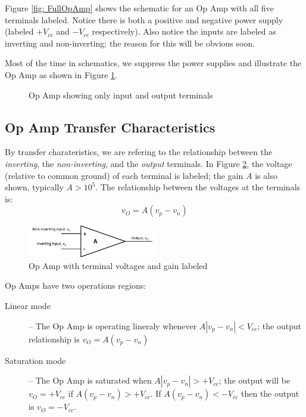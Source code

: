 \documentclass{handout}
\begin{document}
Figure \ref{fig: FullOpAmp} shows the schematic for an Op Amp with all five terminals labeled.  Notice there is both a positive and negative power supply (labeled $+V_{cc}$ and $-V_{cc}$ respectively).  Also notice the inputs are labeled as inverting and non-inverting; the reason for this will be obvious soon.

Most of the time in schematics, we suppress the power supplies and illustrate the Op Amp as shown in Figure \ref{fig: OpAmp}.
\begin{figure} [h! t! b!]
\centering
{}
\caption{Op Amp showing only input and output terminals}
\label{fig: OpAmp}
\end{figure}

\subsection{Op Amp Transfer Characteristics}
By transfer charateristics, we are refering to the relationship between the {\em inverting}, the {\em non-inverting}, and the {\em output} terminals.  In Figure \ref{fig: OpAmp2}, the voltage (relative to common ground) of each terminal is labeled; the gain $A$  is also shown, typically $A>10^5$.  The relationship between the voltages at the terminals is:
\begin{equation}
v_O=A(v_p-v_n)
\end{equation}

\begin{figure} [h! t! b!]
\centering
\includegraphics[width=0.5\textwidth]{OpAmp2.jpg}
\caption{Op Amp with terminal voltages  and gain labeled}
\label{fig: OpAmp2}
\end{figure}

Op Amps have two operations regions:
\begin{description}
\item[Linear mode] -- The Op Amp is operating lineraly whenever $A|v_p-v_n|<V_{cc}$; the output relationship is $v_O=A(v_p-v_n)$
\item[Saturation mode] -- The Op Amp is saturated when $A|v_p-v_n|>+V_{cc}$; the output will be $v_O=+V_{cc}$ if $A(v_p-v_n)>+V_{cc}$.  If $A(v_p-v_n)<-V_{cc}$ then the output is $v_O=-V_{cc}$.
\end{description}
\end{document}
